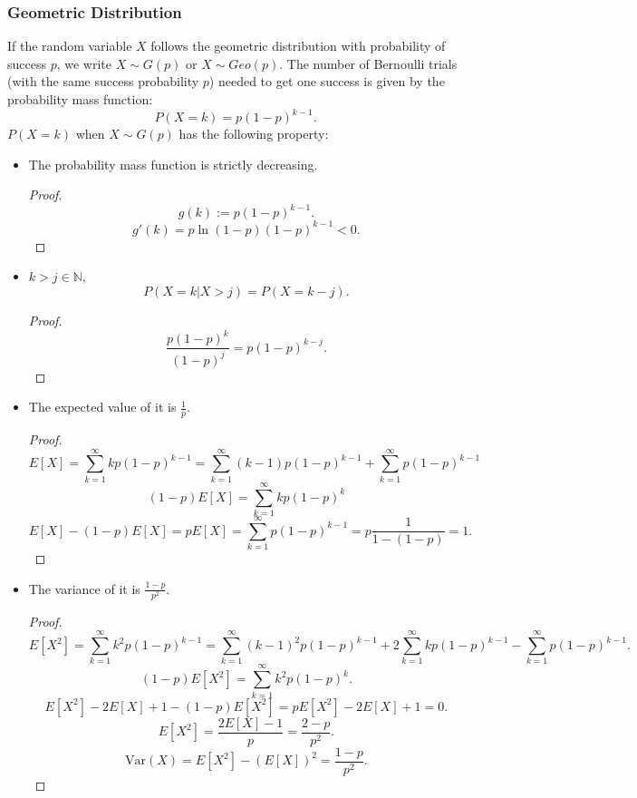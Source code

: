\documentclass[a4paper,12pt]{report}
\begin{document}
\subsubsection{Geometric Distribution}
If the random variable $X$ follows the geometric distribution with probability of success $p$, we write $X\sim G(p)$ or $X \sim Geo(p)$. The number of Bernoulli trials (with the same success probability $p$) needed to get one success is given by the probability mass function:
\[P(X=k)=p(1-p)^{k-1}.\]
$P(X=k)$ when $X\sim G(p)$ has the following property:
\begin{itemize}
\item The probability mass function is strictly decreasing.
\begin{proof}
\[g(k):=p(1-p)^{k-1}.\]
\[g'(k)=p\ln(1-p)(1-p)^{k-1}<0.\]
\end{proof}
\item $k>j\in\mathbb{N}$,
\[P(X=k|X>j)=P(X=k-j).\]
\begin{proof}
\[\frac{p(1-p)^k}{(1-p)^j}=p(1-p)^{k-j}.\]
\end{proof}
\item The expected value of it is $\frac{1}{p}$.
\begin{proof}
\[E[X]=\sum_{k=1}^{\infty}kp(1-p)^{k-1}=\sum_{k=1}^{\infty}(k-1)p(1-p)^{k-1}+\sum_{k=1}^{\infty}p(1-p)^{k-1}\]
\[(1-p)E[X]=\sum_{k=1}^{\infty}kp(1-p)^k\]
\[E[X]-(1-p)E[X]=pE[X]=\sum_{k=1}^{\infty}p(1-p)^{k-1}=p\frac{1}{1-(1-p)}=1.\]
\end{proof}
\item The variance of it is $\frac{1-p}{p^2}$.
\begin{proof}
\[E[X^2]=\sum_{k=1}^{\infty}k^2p(1-p)^{k-1}=\sum_{k=1}^{\infty}(k-1)^2p(1-p)^{k-1}+2\sum_{k=1}^{\infty}kp(1-p)^{k-1}-\sum_{k=1}^{\infty}p(1-p)^{k-1}.\]
\[(1-p)E[X^2]=\sum_{k=1}^{\infty}k^2p(1-p)^k.\]
\[E[X^2]-2E[X]+1-(1-p)E[X^2]=pE[X^2]-2E[X]+1=0.\]
\[E[X^2]=\frac{2E[X]-1}{p}=\frac{2-p}{p^2}.\]
\[\text{Var}(X)=E[X^2]-(E[X])^2=\frac{1-p}{p^2}.\]
\end{proof}
\end{itemize}
\end{document}
